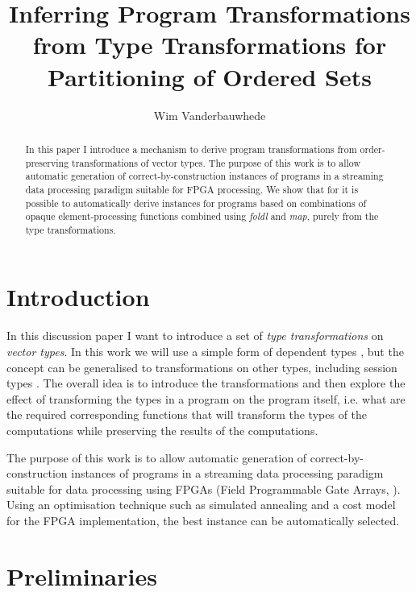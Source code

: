 \documentclass{article}
\begin{document}
\title{Inferring Program Transformations from Type Transformations for Partitioning of Ordered Sets}


\author{Wim Vanderbauwhede}


\maketitle

\begin{abstract}
In this paper I introduce a mechanism to derive program transformations
from order-preserving transformations of vector types. The purpose
of this work is to allow automatic generation of correct-by-construction
instances of programs in a streaming data processing paradigm suitable
for FPGA processing. We show that for it is possible to automatically
derive instances for programs based on combinations of opaque element-processing
functions combined using \emph{foldl} and \emph{map}, purely from
the type transformations. 
\end{abstract}

\section{Introduction}

In this discussion paper I want to introduce a set of \emph{type transformations}
on \emph{vector types}. In this work we will use a simple form of dependent types \cite{bove2009dependent}, but the concept can be generalised to transformations
on other types, including session types \cite{honda2008multiparty}. The overall idea is to introduce
the transformations and then explore the effect of transforming the
types in a program on the program itself, i.e. what are the required
corresponding functions that will transform the types of the computations
while preserving the results of the computations.

The purpose of this work is to allow automatic generation of correct-by-construction instances of programs in a streaming data processing paradigm suitable for data processing using FPGAs (Field Programmable Gate Arrays, \cite{vanderbauwhede2013high}). Using an optimisation technique such as simulated annealing \cite{aarts1988simulated} and a cost model for the FPGA implementation, the best instance can be automatically selected. 

\section{Preliminaries}
\end{document}
